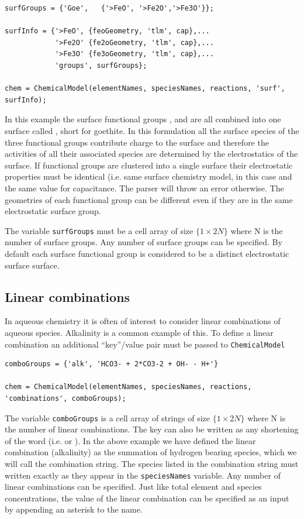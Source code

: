 \documentclass{article}
\begin{document}
\begin{lstlisting}
surfGroups = {'Goe',   {'>FeO', '>Fe2O','>Fe3O'}};

surfInfo = {'>FeO', {feoGeometry, 'tlm', cap},...
            '>Fe2O' {fe2oGeometry, 'tlm', cap},...
            '>Fe3O' {fe3oGeometry, 'tlm', cap},...
            'groups', surfGroups};

chem = ChemicalModel(elementNames, speciesNames, reactions, 'surf', surfInfo);
\end{lstlisting}
In this example the surface functional groups ,  and  are all combined into one surface called , short for goethite. In this formulation all the surface species of the three functional groups contribute charge to the  surface and therefore the activities of all their associated species are determined by the electrostatics of the  surface. If functional groups are clustered into a single surface their electrostatic properties must be identical (i.e. same surface chemistry model, in this case  and the same value for capacitance. The parser will throw an error otherwise. The geometries of each functional group can be different even if they are in the same electrostatic surface group. 

The variable \verb|surfGroups| must be a cell array of size $\{1\times2N\}$ where N is the number of surface groups. Any number of surface groups can be specified. By default each surface functional group is considered to be a distinct electrostatic surface surface.


\subsection{Linear combinations}

In aqueous chemistry it is often of interest to consider linear combinations of aqueous species. Alkalinity is a common example of this. To define a linear combination an additional ``key''/value pair must be passed to \verb|ChemicalModel|

\begin{lstlisting}
comboGroups = {'alk', 'HCO3- + 2*CO3-2 + OH- - H+'}

chem = ChemicalModel(elementNames, speciesNames, reactions, 'combinations', comboGroups);
\end{lstlisting}
The variable \verb|comboGroups| is a cell array of strings of size $\{1\times2N\}$ where N is the number of linear combinations. The key  can also be written as any shortening of the word (i.e.  or ). In the above example we have defined the linear combination  (alkalinity) as the summation of hydrogen bearing species, which we will call the combination string. The species listed in the combination string must written exactly as they appear in the \verb|speciesNames| variable. Any number of linear combinations can be specified. Just like total element and species concentrations, the value of the linear combination can be specified as an input by appending an asterisk to the name.
\end{document}
